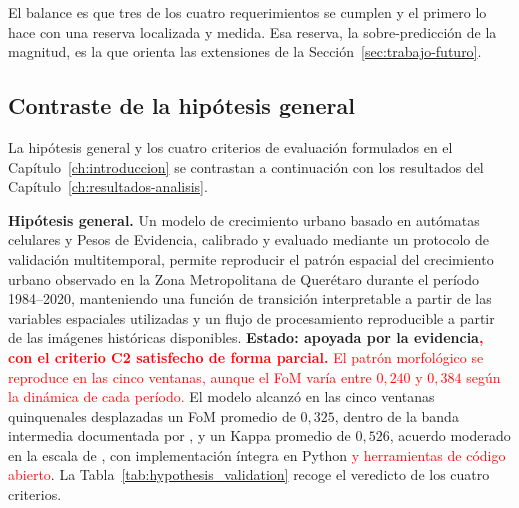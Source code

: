El balance es que tres de los cuatro requerimientos se cumplen y el primero lo hace con una reserva localizada y medida. Esa reserva, la sobre-predicción de la magnitud, es la que orienta las extensiones de la Sección~\ref{sec:trabajo-futuro}.

\subsection{Contraste de la hipótesis general}

La hipótesis general y los cuatro criterios de evaluación formulados en el Capítulo~\ref{ch:introduccion} se contrastan a continuación con los resultados del Capítulo~\ref{ch:resultados-analisis}.

\textbf{Hipótesis general.} Un modelo de crecimiento urbano basado en autómatas celulares y Pesos de Evidencia, calibrado y evaluado mediante un protocolo de validación multitemporal, permite reproducir el patrón espacial del crecimiento urbano observado en la Zona Metropolitana de Querétaro durante el período 1984--2020, manteniendo una función de transición interpretable a partir de las variables espaciales utilizadas y un flujo de procesamiento reproducible a partir de las imágenes históricas disponibles. \textbf{Estado: apoyada por la evidencia}\textcolor{red}{\textbf{, con el criterio C2 satisfecho de forma parcial.} El patrón morfológico se reproduce en las cinco ventanas, aunque el FoM varía entre $0{,}240$ y $0{,}384$ según la dinámica de cada período.} El modelo alcanzó en las cinco ventanas quinquenales desplazadas un FoM promedio de $0{,}325$, dentro de la banda intermedia documentada por \textcite{pontius2008comparing}, y un Kappa promedio de $0{,}526$, acuerdo moderado en la escala de \textcite{LandisKoch1977}, con implementación íntegra en Python \textcolor{red}{y herramientas de código abierto}. La Tabla~\ref{tab:hypothesis_validation} recoge el veredicto de los cuatro criterios.

